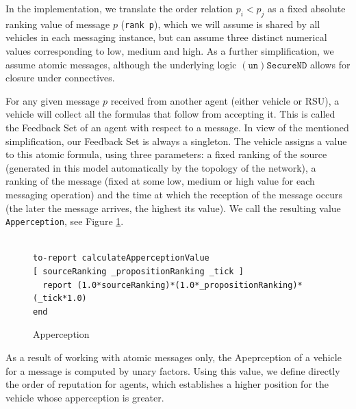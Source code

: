 \documentclass[compsoc, conference, letterpaper, 10pt, times]{IEEEtran}
\newtheorem{definition}{Definition}
\begin{document}
In the implementation, we translate the order relation $p_{i}<p_{j}$ as a fixed absolute ranking value of message $p$ (\texttt{rank p}), which we will assume is shared by all vehicles in each messaging instance, but can assume three distinct numerical values corresponding to low, medium and high. As a further simplification, we assume atomic messages, although the underlying logic $\mathtt{(un)SecureND}$ allows for closure under connectives.

For any given message $p$ received from another agent (either vehicle or RSU), a vehicle will collect all the formulas that follow from accepting it. This is called the Feedback Set of an agent with respect to a message. In view of the mentioned simplification, our Feedback Set is always a singleton. The vehicle assigns a value to this atomic formula, using three parameters: a fixed ranking of the source (generated in this model automatically by the topology of the network), a ranking of the message (fixed at some low, medium or high value for each messaging operation) and the time at which the reception of the message occurs (the later the message arrives, the highest its value). We call the resulting value \texttt{Apperception}, see Figure \ref{fig:routine1}.

\begin{figure}[t]
 	\lstset{language=Java,
 		basicstyle=\scriptsize,
 		mathescape}
 	\begin{lstlisting}[frame=single]  % Start your code-block

to-report calculateApperceptionValue
[ sourceRanking _propositionRanking _tick ]
  report (1.0*sourceRanking)*(1.0*_propositionRanking)*(_tick*1.0)
end
\end{lstlisting}
\caption{Apperception}\label{fig:routine1}
%
\end{figure}
As a result of working with atomic messages only, the Apeprception of a vehicle for a message is computed by unary factors. Using this value, we define directly the order of reputation for agents, which establishes a higher position for the vehicle whose apperception is greater.
%
\end{document}
